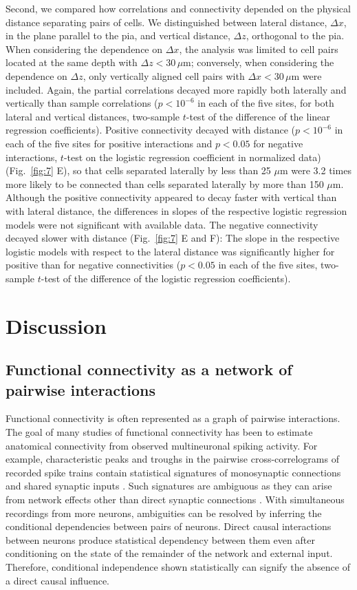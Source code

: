 Second, we compared how correlations and connectivity depended on the physical distance separating pairs of cells. We distinguished between lateral distance, $\Delta x$, in the plane parallel to the pia, and vertical distance, $\Delta z$, orthogonal to the pia.  When considering the dependence on $\Delta x$, the analysis was limited to cell pairs located at the same depth with $\Delta z < 30\,\mu\mbox{m}$; conversely, when considering the dependence on $\Delta z$, only vertically aligned cell pairs with $\Delta x < 30\,\mu\mbox{m}$ were included. Again, the partial correlations decayed more rapidly both laterally and vertically than sample correlations ($p<10^{-6}$ in each of the five sites, for both lateral and vertical distances, two-sample $t$-test of the difference of the linear regression coefficients).
Positive connectivity decayed with distance ($p<10^{-6}$ in each of the five sites for positive interactions and $p<0.05$ for negative interactions, $t$-test on the logistic regression coefficient in normalized data) (Fig.~\ref{fig:7} E), so that cells separated laterally by less than 25 $\mu\mbox{m}$ were 3.2 times more likely to be connected than cells separated laterally by more than 150 $\mu\mbox{m}$. Although the positive connectivity appeared to decay faster with vertical than with lateral distance, the differences in slopes of the respective logistic regression models were not significant with available data. The negative connectivity decayed slower with distance (Fig.~\ref{fig:7} E and F): The slope in the respective logistic models with respect to the lateral distance was significantly higher for positive than for negative connectivities ($p<0.05$ in each of the five sites, two-sample $t$-test of the difference of the logistic regression coefficients).

\section*{Discussion}
\subsection*{Functional connectivity as a network of pairwise interactions}
Functional connectivity is often represented as a graph of pairwise interactions. The goal of many studies of functional connectivity has been to estimate  anatomical connectivity from  observed multineuronal spiking activity.  For example, characteristic peaks and troughs in the pairwise cross-correlograms of recorded spike trains contain statistical signatures of monosynaptic connections and shared synaptic inputs \cite{Gerstein:1964, Perkel:1967, Moore:1970, Alonso:1998, Denman:2013}.  Such signatures are ambiguous as they can arise from network effects other than direct synaptic connections \cite{Aertsen:1989}.  With simultaneous recordings from more neurons, ambiguities can be resolved by inferring the conditional dependencies between pairs of neurons.  Direct causal interactions between neurons produce statistical dependency between them even after conditioning on the state of the remainder of the network and external input. Therefore, conditional independence shown statistically can signify the absence of a direct causal influence.

